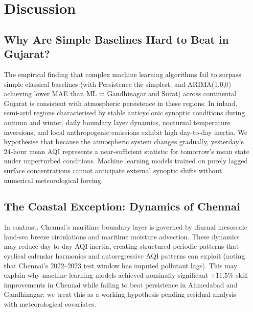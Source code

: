 \section{Discussion}
\label{sec:discussion}

\subsection{Why Are Simple Baselines Hard to Beat in Gujarat?}
The empirical finding that complex machine learning algorithms fail to surpass simple classical baselines (with Persistence the simplest, and ARIMA(1,0,0) achieving lower MAE than ML in Gandhinagar and Surat) across continental Gujarat is consistent with atmospheric persistence in these regions. In inland, semi-arid regions characterised by stable anticyclonic synoptic conditions during autumn and winter, daily boundary layer dynamics, nocturnal temperature inversions, and local anthropogenic emissions exhibit high day-to-day inertia. We hypothesise that because the atmospheric system changes gradually, yesterday's 24-hour mean AQI represents a near-sufficient statistic for tomorrow's mean state under unperturbed conditions. Machine learning models trained on purely lagged surface concentrations cannot anticipate external synoptic shifts without numerical meteorological forcing.

\subsection{The Coastal Exception: Dynamics of Chennai}
In contrast, Chennai's maritime boundary layer is governed by diurnal mesoscale land-sea breeze circulations and maritime moisture advection. These dynamics may reduce day-to-day AQI inertia, creating structured periodic patterns that cyclical calendar harmonics and autoregressive AQI patterns can exploit (noting that Chennai's 2022--2023 test window has imputed pollutant lags). This may explain why machine learning models achieved nominally significant $+11.5\%$ skill improvements in Chennai while failing to beat persistence in Ahmedabad and Gandhinagar; we treat this as a working hypothesis pending residual analysis with meteorological covariates.

